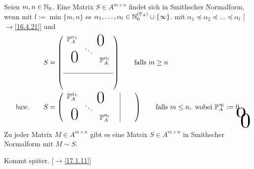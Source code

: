 \documentclass[../../main.tex]{subfiles}
\begin{document}
\begin{df}\label{17.1.2}
Seien $m,n\in \mathbb N_0$. Eine Matrix $S\in A^{m\times n}$ findet sich in Smithscher Normalform, wenn mit $l:=\min\{m,n\}$ es $\alpha_1,\ldots ,\alpha_l\in \mathbb N_0^{(\mathbb P_A)}\cup\{\infty\}$. mit $\alpha_1\preceq\alpha_2\preceq\ldots \preceq\alpha_l$ [$\to$\ref{16.4.21}] und 
\begin{align*}
&S=\left(\begin{array}{c c c}
\P_A^{\alpha_1}& \multicolumn{2}{c}{\text{\kern 1em\smash{\raisebox{-1.5ex}{\Huge 0}}}} \\
& \ddots &  \\
\multicolumn{2}{c}{\text{\kern-1.5em\smash{\raisebox{0ex}{\Huge 0}}}} &\P_A^{\alpha_l}\\
& &\\
\hline 
&\tikz[remember picture]\node[inner sep=0pt] (a){ };&\\
& &
\end{array}\right)\qquad\text{falls }m\ge n\\
\text{bzw.}\qquad&S=\left(\begin{array}{c c c c|c c}
 \P_A^{\alpha_1}& \multicolumn{2}{c}{\text{\kern 1em\smash{\raisebox{-1.5ex}{\Huge 0}}}}& &\tikz[remember picture]\node[inner sep=0pt] (b){ }; &\\
& \ddots & & \\
\multicolumn{2}{c}{\text{\kern-1.5em\smash{\raisebox{0ex}{\Huge 0}}}}& \P_A^{\alpha_l}& &\\
\end{array}\right)\qquad\text{falls }m\le n,\text{ wobei } \P_A^\infty:=0. 
\begin{tikzpicture}[overlay, remember picture]
\node at (a.north) [anchor=center,yshift=-0.2cm, yscale=2,xscale=3] {$0$};
\node at (b.east) [anchor=center, xshift=0.2cm,yshift=-0.6cm,  xscale=3, yscale=3] {$0$};
\end{tikzpicture}
\end{align*}
\end{df}

\begin{sat}\label{17.1.3}
Zu jeder Matrix $M\in A^{m\times n}$ gibt es eine Matrix $S\in A^{m\times n}$ in Smithscher Normalform mit $M\sim S$.
\end{sat}
\begin{cproof}
Kommt später. [$\to$\ref{17.1.11}]
\end{cproof}
\end{document}
